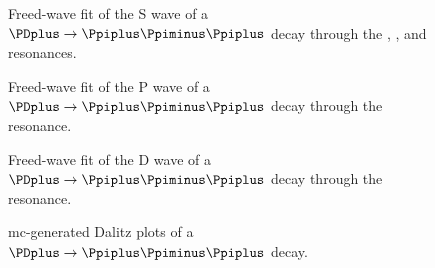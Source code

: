     \begin{figure}
        \centering
        \subfloat[][]{}

        \subfloat[][]{}

        \caption{Freed-wave fit of the S wave of a $\PDplus \to \Ppiplus\Ppiminus\Ppiplus$ decay through the \Pfnez{}, \Pfofzz, and \Psigma{} resonances.}
    \end{figure}
    \begin{figure}
        \centering
        \subfloat[][]{}

        \subfloat[][]{}

        \caption{Freed-wave fit of the P wave of a $\PDplus \to \Ppiplus\Ppiminus\Ppiplus$ decay through the \Prhozero{} resonance.}
    \end{figure}
    \begin{figure}
        \centering
        \subfloat[][]{}

        \subfloat[][]{}

        \caption{Freed-wave fit of the D wave of a $\PDplus \to \Ppiplus\Ppiminus\Ppiplus$ decay through the \Pfii{} resonance.}
    \end{figure}
    \begin{figure}
        \centering

        \caption{\ac{mc}-generated Dalitz plots of a $\PDplus \to \Ppiplus\Ppiminus\Ppiplus$ decay.}
    \end{figure}
